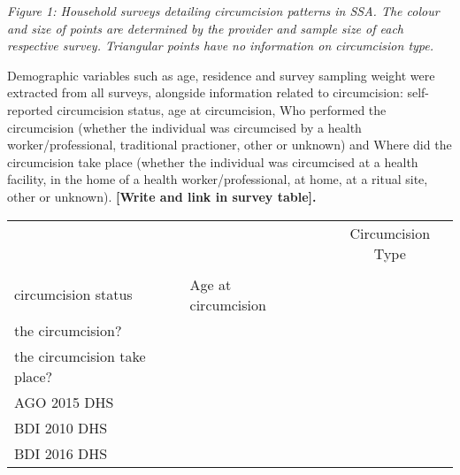 \documentclass[a4paper, 12pt]{article}
\begin{document}
\emph{Figure 1: Household surveys detailing circumcision patterns in SSA. The colour and size of points are determined by the provider and sample size of each respective survey. Triangular points have no information on circumcision type.}


Demographic variables such as age, residence and survey sampling weight were extracted from all surveys, alongside information related to circumcision: self-reported circumcision status, age at circumcision, Who performed the circumcision (whether the individual was circumcised by a health worker/professional, traditional practioner, other or unknown)  and Where did the circumcision take place (whether the individual was circumcised at a health facility, in the home of a health worker/professional, at home, at a ritual site, other or unknown). \textbf{[Write and link in survey table].}

\newcommand{\cmark}{\ding{51}}
\newcommand{\xmark}{\ding{55}}

\begin{longtable}{l|llll}
\toprule
\multicolumn{1}{l}{} &  &  & \multicolumn{2}{c}{Circumcision Type} \\ 
\cmidrule(lr){4-5}
\multicolumn{1}{l}{} & \begin{tabular}{c}Self-reported \\[-5pt] circumcision status\end{tabular} & Age at circumcision & \begin{tabular}{c}Who performed \\[-5pt] the circumcision?\end{tabular} & \begin{tabular}{c}Where did \\[-5pt] the circumcision take place?\end{tabular} \\ 
\midrule
AGO 2015 DHS & \cmark & \cmark & \cmark & \cmark \\ 
BDI 2010 DHS & \cmark & \cmark & \cmark & \cmark \\ 
BDI 2016 DHS & \cmark & \cmark & \cmark & \cmark \\ 
\bottomrule
\end{longtable}
\end{document}
